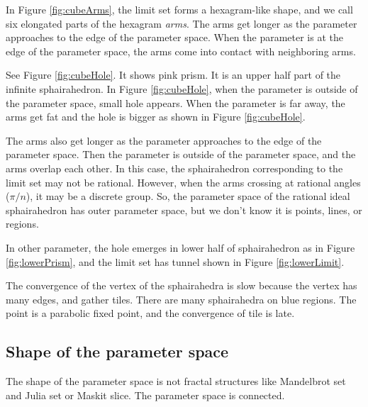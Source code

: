 \documentclass[suppldata, dvipdfmx]{interact}
\theoremstyle{plain}%
\theoremstyle{definition}
\theoremstyle{remark}
\theoremstyle{problemstyle}
\begin{document}
In Figure \ref{fig:cubeArms}, the limit set forms a hexagram-like shape,
and we call six elongated parts of the hexagram \textit{arms}.
The arms get longer as the parameter approaches to the edge of the
parameter space.
When the parameter is at the edge of the parameter space,
the arms come into contact with neighboring arms.

See Figure \ref{fig:cubeHole}. It shows pink prism.
It is an upper half part of the infinite sphairahedron.
In Figure \ref{fig:cubeHole},
when the parameter is outside of the parameter space,
small hole appears. When the parameter is far away,
the arms get fat and the hole is bigger as shown in 
Figure \ref{fig:cubeHole}.

The arms also get longer as the parameter approaches
to the edge of the parameter space.
Then the parameter is outside of the parameter space, and the
arms overlap each other.
In this case, the sphairahedron corresponding to the limit set may not be
rational.
However, when the arms crossing at rational angles ($\pi/n$),
it may be a discrete group.
So, the parameter space of the rational ideal sphairahedron has outer
parameter space, but we don't know it is points, lines, or regions.

In other parameter, the hole emerges in lower half of sphairahedron as
in Figure \ref{fig:lowerPrism}, and 
the limit set has tunnel shown in Figure \ref{fig:lowerLimit}.

The convergence of the vertex of the sphairahedra is slow
because the vertex has many edges, and gather tiles.
There are many sphairahedra on blue regions.
The point is a parabolic fixed point, and the convergence of tile is
late.

\subsection{Shape of the parameter space}
The shape of the parameter space is not fractal structures like
Mandelbrot set and Julia set or Maskit slice. 
The parameter space is connected.

\end{document}
